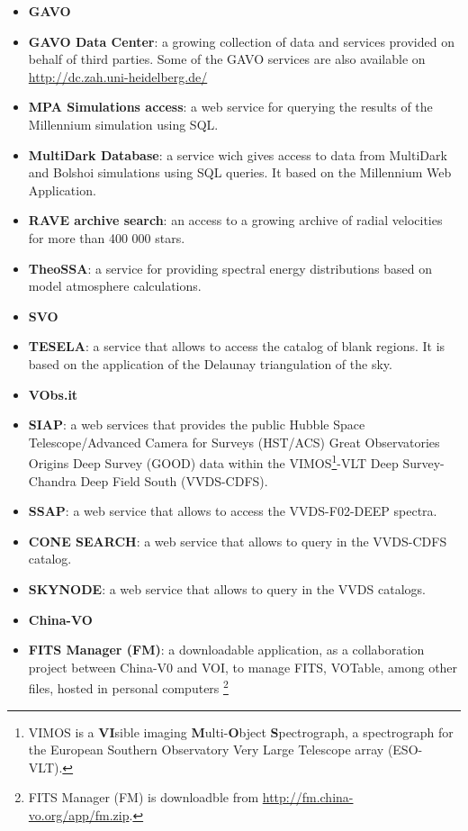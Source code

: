 \begin{itemize}
\item \textbf{GAVO}
\item \textbf{GAVO Data Center}:
a growing collection of data and services provided on behalf of third parties.
Some of the GAVO services are also available on
\url{http://dc.zah.uni-heidelberg.de/}

\item \textbf{MPA Simulations access}:
a web service for querying the results of the Millennium simulation using SQL.

\item \textbf{MultiDark Database}:
a service wich gives access to data from MultiDark and Bolshoi simulations using
SQL queries.  It based on the Millennium Web Application.

\item \textbf{RAVE archive search}:
an access to a growing archive of radial velocities for more than 400 000 stars.

\item \textbf{TheoSSA}:
a service for providing spectral energy distributions based on model atmosphere
calculations.

\item \textbf{SVO}
\item \textbf{TESELA}:
a service that allows to access the catalog of blank regions. It is based on the
application of the Delaunay triangulation of the sky.

\item \textbf{VObs.it}
\item \textbf{SIAP}:
a web services that provides the public Hubble Space Telescope/Advanced Camera
for Surveys (HST/ACS) Great Observatories Origins Deep Survey (GOOD) data within
the VIMOS\footnote{VIMOS is a \textbf{VI}sible imaging
\textbf{M}ulti-\textbf{O}bject \textbf{S}pectrograph, a spectrograph for the
European Southern Observatory Very Large Telescope array (ESO-VLT).}-VLT Deep
Survey-Chandra Deep Field South (VVDS-CDFS).

\item \textbf{SSAP}:
a web service that allows to access the VVDS-F02-DEEP spectra.

\item \textbf{CONE SEARCH}:
a web service that allows to query in the VVDS-CDFS catalog. 

\item \textbf{SKYNODE}:
a web service that allows to query in the VVDS catalogs. 

\item \textbf{China-VO}
\item \textbf{FITS Manager (FM)}:
a downloadable application, as a collaboration project between China-V0 and VOI,
to manage FITS, VOTable, among other files, hosted in personal computers
\footnote{FITS Manager (FM) is downloadble from
\url{http://fm.china-vo.org/app/fm.zip}.} 


\end{itemize}
